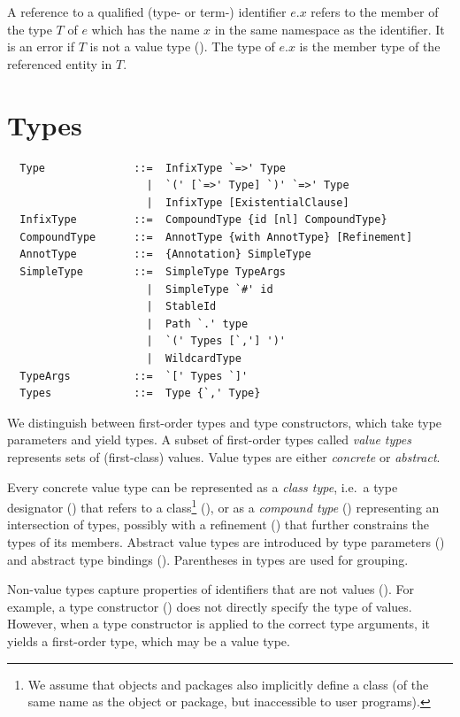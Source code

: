 A reference to a qualified (type- or term-) identifier $e.x$ refers to
the member of the type $T$ of $e$ which has the name $x$ in the same
namespace as the identifier. It is an error if $T$ is not a value type
(). The type of $e.x$ is the member type of the
referenced entity in $T$.

\chapter{\label{sec:types}Types}

\syntax\begin{lstlisting}
  Type              ::=  InfixType `=>' Type
                      |  `(' [`=>' Type] `)' `=>' Type
                      |  InfixType [ExistentialClause]
  InfixType         ::=  CompoundType {id [nl] CompoundType}
  CompoundType      ::=  AnnotType {with AnnotType} [Refinement]
  AnnotType         ::=  {Annotation} SimpleType
  SimpleType        ::=  SimpleType TypeArgs
                      |  SimpleType `#' id
                      |  StableId
                      |  Path `.' type
                      |  `(' Types [`,'] ')'
                      |  WildcardType
  TypeArgs          ::=  `[' Types `]'
  Types             ::=  Type {`,' Type}
\end{lstlisting}

We distinguish between first-order types and type constructors, which
take type parameters and yield types. A subset of first-order types
called {\em value types} represents sets of (first-class) values.
Value types are either {\em concrete} or {\em abstract}. 

Every concrete value type can be represented as a {\em class type}, i.e.\ a
type designator () that refers to a
class\footnote{We assume that objects and packages also implicitly
define a class (of the same name as the object or package, but
inaccessible to user programs).} (), or as a {\em
compound type} () representing an
intersection of types, possibly with a refinement
() that further constrains the types of its
members.
Abstract value types are introduced by type parameters () and abstract type bindings (). Parentheses in types are used for
grouping.

Non-value types capture properties of identifiers that are not values
(). For example, a type constructor () does not directly specify the type of values. However, when a type constructor is applied to the correct type arguments, it yields a first-order type, which may be a value type. 

